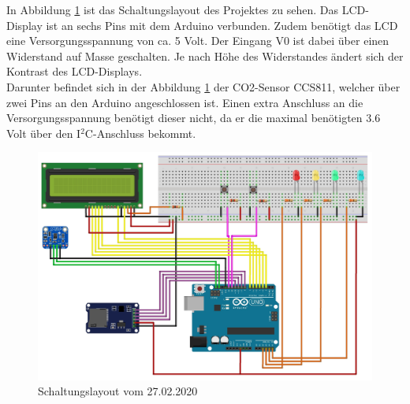 \label{Schaltungslayout}

In Abbildung \ref{fig:Layout} ist das Schaltungslayout des Projektes zu sehen. Das LCD-Display ist an sechs Pins mit dem Arduino verbunden. Zudem benötigt das LCD eine Versorgungsspannung von ca. 5 Volt. Der Eingang V0 ist dabei über einen Widerstand auf Masse geschalten. Je nach Höhe des Widerstandes ändert sich der Kontrast des LCD-Displays. \\
Darunter befindet sich in der Abbildung \ref{fig:Layout} der CO2-Sensor CCS811, welcher über zwei Pins an den Arduino angeschlossen ist. Einen extra Anschluss an die Versorgungsspannung benötigt dieser nicht, da er die maximal benötigten $3.6$ Volt über den I$^2$C-Anschluss bekommt. \\


\begin{figure}[!hbt]
	\centering
	\includegraphics[width=0.9\linewidth]{Images/Layout_Steckplatine}
	\caption{Schaltungslayout vom 27.02.2020}
	\label{fig:Layout}
\end{figure}